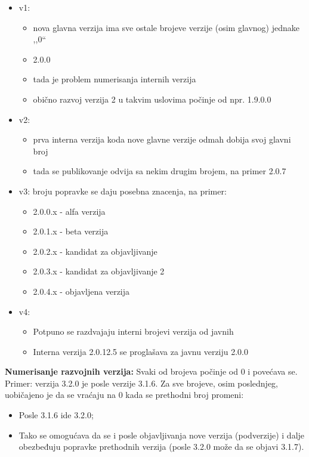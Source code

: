 \documentclass[a4paper]{article}
\begin{document}
  \begin{itemize}
    \item v1:
        \begin{itemize}
          \item nova glavna verzija ima sve ostale brojeve verzije (osim glavnog) jednake ,,0``
          \item 2.0.0
          \item tada je problem numerisanja internih verzija
          \item obično razvoj verzija 2 u takvim uslovima počinje od npr. 1.9.0.0
        \end{itemize}
    \item v2:
        \begin{itemize}
          \item prva interna verzija koda nove glavne verzije odmah dobija svoj glavni broj
          \item tada se publikovanje odvija sa nekim drugim brojem, na primer 2.0.7
        \end{itemize}
    \item v3: broju popravke se daju posebna znacenja, na primer:
        \begin{itemize}
          \item 2.0.0.x - alfa verzija
          \item 2.0.1.x - beta verzija
          \item 2.0.2.x - kandidat za objavljivanje
          \item 2.0.3.x - kandidat za objavljivanje 2
          \item 2.0.4.x - objavljena verzija
        \end{itemize}
    \item v4:
        \begin{itemize}
          \item Potpuno se razdvajaju interni brojevi verzija od javnih
          \item Interna verzija 2.0.12.5 se proglašava za javnu verziju 2.0.0
        \end{itemize}
  \end{itemize}
  \textbf{Numerisanje razvojnih verzija:} Svaki od brojeva počinje od 0 i povećava se. Primer: 
  verzija 3.2.0 je posle verzije 3.1.6. Za sve brojeve, osim poslednjeg, uobičajeno je da se 
  vraćaju na 0 kada se prethodni broj promeni:
  \begin{itemize}
    \item Posle 3.1.6 ide 3.2.0;
    \item Tako se omogućava da se i posle objavljivanja nove verzija (podverzije) i dalje 
          obezbeđuju popravke prethodnih verzija (posle 3.2.0 može da se objavi 3.1.7).
  \end{itemize}
\end{document}
